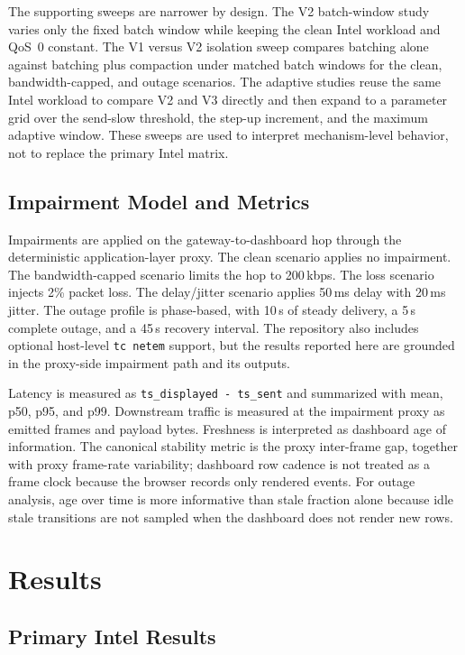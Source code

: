 The supporting sweeps are narrower by design. The V2 batch-window study varies only the fixed batch window while keeping the clean Intel workload and QoS~0 constant. The V1 versus V2 isolation sweep compares batching alone against batching plus compaction under matched batch windows for the clean, bandwidth-capped, and outage scenarios. The adaptive studies reuse the same Intel workload to compare V2 and V3 directly and then expand to a parameter grid over the send-slow threshold, the step-up increment, and the maximum adaptive window. These sweeps are used to interpret mechanism-level behavior, not to replace the primary Intel matrix.

\subsection{Impairment Model and Metrics}

Impairments are applied on the gateway-to-dashboard hop through the deterministic application-layer proxy. The clean scenario applies no impairment. The bandwidth-capped scenario limits the hop to 200\,kbps. The loss scenario injects 2\% packet loss. The delay/jitter scenario applies 50\,ms delay with 20\,ms jitter. The outage profile is phase-based, with 10\,s of steady delivery, a 5\,s complete outage, and a 45\,s recovery interval. The repository also includes optional host-level \texttt{tc netem} support, but the results reported here are grounded in the proxy-side impairment path and its outputs.

Latency is measured as \texttt{ts\_displayed - ts\_sent} and summarized with mean, p50, p95, and p99. Downstream traffic is measured at the impairment proxy as emitted frames and payload bytes. Freshness is interpreted as dashboard age of information. The canonical stability metric is the proxy inter-frame gap, together with proxy frame-rate variability; dashboard row cadence is not treated as a frame clock because the browser records only rendered events. For outage analysis, age over time is more informative than stale fraction alone because idle stale transitions are not sampled when the dashboard does not render new rows.

\section{Results}

\subsection{Primary Intel Results}

